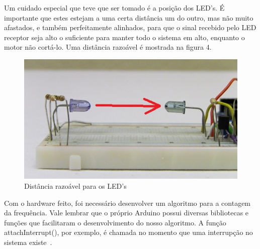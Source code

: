 Um cuidado especial que teve que ser tomado é a posição dos LED's. É importante que estes estejam a uma certa distância um do outro, mas não muito afastados, e também perfeitamente alinhados, para que o sinal recebido pelo LED receptor seja alto o suficiente para manter todo o sistema em alto, enquanto o motor não cortá-lo. Uma distância razoável é mostrada na figura 4.

\begin{figure}[!h]
	\centering
	\includegraphics{./break__beam_small.jpg}
	\caption[Distância razoável para os LED's]{Distância razoável para os LED's}
	\label{fig:break__beam_small}
\end{figure}

Com o hardware feito, foi necessário desenvolver um algoritmo para a contagem da frequência. Vale lembrar que o próprio Arduino possui diversas bibliotecas e funções que facilitaram o desenvolvimento do nosso algoritmo. A função attachInterrupt(), por exemplo, é chamada no momento que uma interrupção no sistema existe~\cite{Arduino_attachInterrupt()}.

